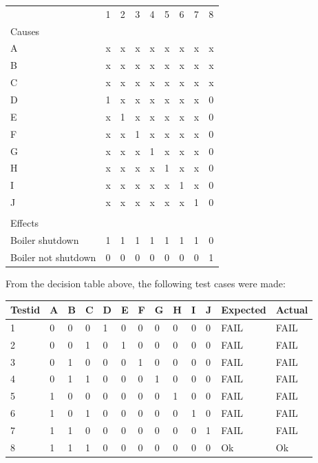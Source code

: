 \begin{adjustbox}{center}
	\begin{tabular}{lllllllll}
		                    & 1 & 2 & 3 & 4 & 5 & 6 & 7 & 8 \\
		Causes              &   &   &   &   &   &   &   &   \\
		\cline{1-1}
		A                   & x & x & x & x & x & x & x & x \\
		B                   & x & x & x & x & x & x & x & x \\
		C                   & x & x & x & x & x & x & x & x \\
		D                   & 1 & x & x & x & x & x & x & 0 \\
		E                   & x & 1 & x & x & x & x & x & 0 \\
		F                   & x & x & 1 & x & x & x & x & 0 \\
		G                   & x & x & x & 1 & x & x & x & 0 \\
		H                   & x & x & x & x & 1 & x & x & 0 \\
		I                   & x & x & x & x & x & 1 & x & 0 \\
		J                   & x & x & x & x & x & x & 1 & 0 \\
		                    &   &   &   &   &   &   &   &   \\
		Effects             &   &   &   &   &   &   &   &   \\
		\cline{1-1}
		Boiler shutdown     & 1 & 1 & 1 & 1 & 1 & 1 & 1 & 0 \\
		Boiler not shutdown & 0 & 0 & 0 & 0 & 0 & 0 & 0 & 1
	\end{tabular}%
\end{adjustbox}


\vspace{20pt}
From the decision table above, the following test cases were made:
\vspace{20pt}

\begin{adjustbox}{center}
	\begin{tabular}{lllllllllllll}
		Testid & A & B & C & D & E & F & G & H & I & J & Expected &
		Actual                                                           \\ \hline
		1      & 0 & 0 & 0 & 1 & 0 & 0 & 0 & 0 & 0 & 0 & FAIL     & FAIL \\
		2      & 0 & 0 & 1 & 0 & 1 & 0 & 0 & 0 & 0 & 0 & FAIL     & FAIL \\
		3      & 0 & 1 & 0 & 0 & 0 & 1 & 0 & 0 & 0 & 0 & FAIL     & FAIL \\
		4      & 0 & 1 & 1 & 0 & 0 & 0 & 1 & 0 & 0 & 0 & FAIL     & FAIL \\
		5      & 1 & 0 & 0 & 0 & 0 & 0 & 0 & 1 & 0 & 0 & FAIL     & FAIL \\
		6      & 1 & 0 & 1 & 0 & 0 & 0 & 0 & 0 & 1 & 0 & FAIL     & FAIL \\
		7      & 1 & 1 & 0 & 0 & 0 & 0 & 0 & 0 & 0 & 1 & FAIL     & FAIL \\
		8      & 1 & 1 & 1 & 0 & 0 & 0 & 0 & 0 & 0 & 0 & Ok       & Ok
	\end{tabular}%
\end{adjustbox}
\vspace{20pt}

